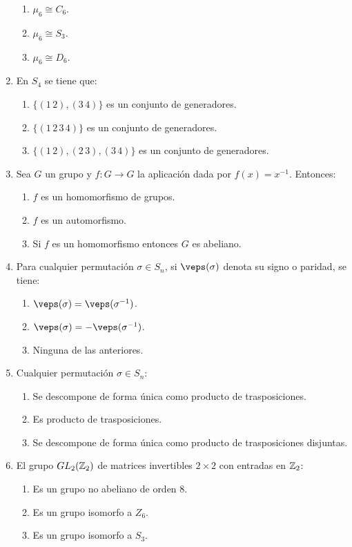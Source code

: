\documentclass[12pt]{article}
\begin{document}
\begin{ejercicio}
\begin{enumerate}
\begin{enumerate}
                \item $\mu_6 \cong C_6$.
                \item $\mu_6 \cong S_3$.
                \item $\mu_6 \cong D_6$.
            \end{enumerate}
            \item En $S_4$ se tiene que:
            \begin{enumerate}
                \item $\{(1\,2),(3\,4)\}$ es un conjunto de generadores.
                \item $\{(1\,2\,3\,4)\}$ es un conjunto de generadores.
                \item $\{(1\,2),(2\,3),(3\,4)\}$ es un conjunto de generadores.
            \end{enumerate}
            \item Sea $G$ un grupo y $f : G \to G$ la aplicación dada por $f(x) = x^{-1}$. Entonces:
            \begin{enumerate}
                \item $f$ es un homomorfismo de grupos.
                \item $f$ es un automorfismo.
                \item Si $f$ es un homomorfismo entonces $G$ es abeliano.
            \end{enumerate}
            \item Para cualquier permutación $\sigma \in S_n$, si $\veps(\sigma)$ denota su signo o paridad, se tiene:
            \begin{enumerate}
                \item $\veps(\sigma) = \veps(\sigma^{-1})$.
                \item $\veps(\sigma) = -\veps(\sigma^{-1})$.
                \item Ninguna de las anteriores.
            \end{enumerate}
            \item Cualquier permutación $\sigma \in S_n$:
            \begin{enumerate}
                \item Se descompone de forma única como producto de trasposiciones.
                \item Es producto de trasposiciones.
                \item Se descompone de forma única como producto de trasposiciones disjuntas.
            \end{enumerate}
            \item El grupo $GL_2(\mathbb{Z}_2)$ de matrices invertibles $2 \times 2$ con entradas en $\mathbb{Z}_2$:
            \begin{enumerate}
                \item Es un grupo no abeliano de orden 8.
                \item Es un grupo isomorfo a $Z_6$.
                \item Es un grupo isomorfo a $S_3$.
            \end{enumerate}
                

\end{enumerate}
\end{ejercicio}
\end{document}
